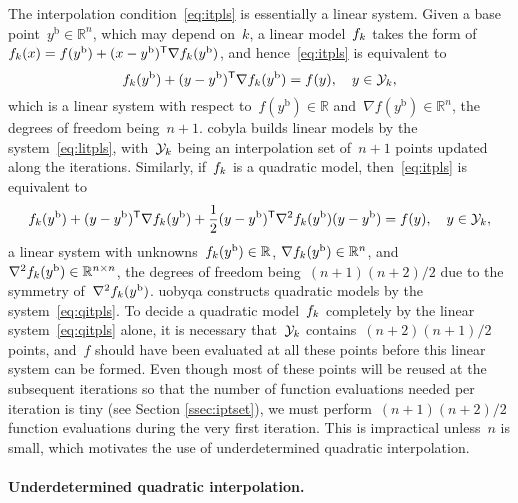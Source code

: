 \documentclass[
    smallextended,  %
    draft,          %
]{svjour3}
\newcommand{\R}{\mathbb{R}}
\newcommand{\T}{\mathsf{T}}
\newcommand{\base}{{\text{b}}}
\newcommand{\objm}[1][k]{\obj\ifthenelse{\equal{#1}{}}{}{_{#1}}}
\newcommand{\obj}{f}
\newcommand{\xpt}[1][k]{\mathcal{Y}\ifthenelse{\equal{#1}{}}{}{_{#1}}}
\begin{document}
The interpolation condition~\eqref{eq:itpls} is essentially a linear system.
Given a base point~$y^{\base}\in \R^n$, which may depend on~$k$, a linear model~$\objm$ takes the form of~$\objm(x) = \obj(y^{\base}) + (x - y^{\base})^{\T} \nabla \objm(y^{\base})$, and hence~\eqref{eq:itpls} is equivalent to
\begin{equation}
    \label{eq:litpls}
    \objm(y^{\base}) + (y -y^{\base})^{\T} \nabla \objm(y^{\base})  = \obj(y),  \quad y \in \xpt,
\end{equation}
which is a linear system with respect to~$\obj(y^\base) \in \R$ and~$\nabla \obj(y^\base) \in \R^n$, the degrees of freedom being~$n+1$.
\Gls{cobyla} builds linear models by the system~\eqref{eq:litpls}, with~$\xpt$ being an interpolation
set of~$n+1$ points updated along the iterations.
Similarly, if~$\objm$ is a quadratic model, then~\eqref{eq:itpls} is equivalent to
\begin{equation}
    \label{eq:qitpls}
    \objm(y^{\base}) + (y -y^{\base})^{\T} \nabla \objm(y^{\base})
    + \frac{1}{2}(y-y^{\base})^{\T}  \nabla^2 \objm(y^{\base}) (y-y^{\base}) = \obj(y),  \quad y \in \xpt,
\end{equation}
a linear system with unknowns~$\objm(y^\base) \in \R$, $\nabla \objm(y^\base) \in \R^n$, and~$\nabla^2 \objm(y^{\base})\in\R^{n \times n}$, the degrees of freedom being~$(n + 1)(n + 2) / 2$ due to the symmetry of~$\nabla^2 \objm(y^\base)$.
\Gls{uobyqa} constructs quadratic models by the system~\eqref{eq:qitpls}.
To decide a quadratic model~$\objm$ completely by the linear system~\eqref{eq:qitpls} alone, it is necessary that~$\xpt$ contains~$(n+2)(n+1)/2$ points, and~$f$ should have been evaluated at all these points before this linear system can be formed.
Even though most of these points will be reused at the subsequent iterations so that the number of function evaluations needed per iteration is tiny (see Section \ref{ssec:iptset}), we must perform~$(n + 1)(n + 2) / 2$ function evaluations during the very first iteration.
This is impractical unless~$n$ is small, which motivates the use of underdetermined quadratic interpolation.

\paragraph{Underdetermined quadratic interpolation.}
\end{document}
